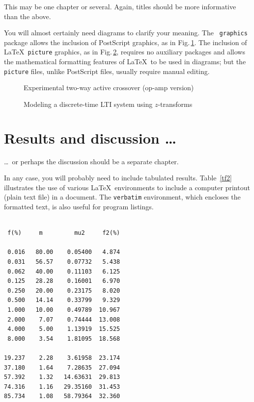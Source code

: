 \documentclass[12pt,openany,a4paper]{book}
\renewcommand{\baselinestretch}{1.2}	%
\newcommand{\fig}[1]  {Fig.\,\ref{#1}}		%
\newcommand{\tab}[1]  {Table~\ref{#1}}		%
\begin{document}
This may be one chapter or several.  Again, titles should be more
informative than the above.

You will almost certainly need diagrams to clarify your meaning.  The
\LaTeXe\ \texttt{graphics} package allows the inclusion of PostScript
graphics, as in \fig{flr1}.  The inclusion of \LaTeX\ \texttt{picture}
graphics, as in \fig{fzsys}, requires no auxiliary packages and allows
the mathematical formatting features of \LaTeX\ to be used in
diagrams; but the \texttt{picture} files, unlike PostScript files,
usually require manual editing.

\begin{figure}[htbp]
\caption{Experimental two-way active crossover (op-amp version)}
\label{flr1}
\end{figure}

\begin{figure}[htbp]
\caption{Modeling a discrete-time LTI system using $z$-transforms}
\label{fzsys}
\end{figure}

\chapter{Results and discussion \ldots}

\ldots\ or perhaps the discussion should be a separate chapter.

In any case, you will probably need to include tabulated results.
\tab{tf2} illustrates the use of various \LaTeX\ environments to
include a computer printout (plain text file) in a document.  The
\texttt{verbatim} environment, which encloses the formatted text, is
also useful for program listings.

\begin{table}\renewcommand{\baselinestretch}{1.0}
\caption{\sl Fraction of air volume involved in heat exchange for
second mode (right column) vs.\ filling factor (left column).  The
plain-text headings represent $f$, $m$, $\mu_2$ and $f_2$.}
\label{tf2}

\begin{center}
\begin{minipage}[c]{2.85in}\small\normalsize
\begin{verbatim}

 f(%)     m         mu2     f2(%)

 0.016   80.00    0.05400   4.874
 0.031   56.57    0.07732   5.438
 0.062   40.00    0.11103   6.125
 0.125   28.28    0.16001   6.970
 0.250   20.00    0.23175   8.020
 0.500   14.14    0.33799   9.329
 1.000   10.00    0.49789  10.967
 2.000    7.07    0.74444  13.008
 4.000    5.00    1.13919  15.525
 8.000    3.54    1.81095  18.568

19.237    2.28    3.61958  23.174
37.180    1.64    7.28635  27.094
57.392    1.32   14.63631  29.813
74.316    1.16   29.35160  31.453
85.734    1.08   58.79364  32.360
\end{verbatim}
\end{minipage}
\end{center}
\end{table}
\end{document}
